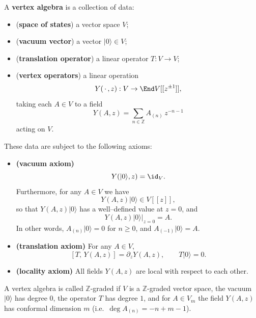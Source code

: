 \documentclass[12pt]{article}
\begin{document}
\begin{definition}
    A \textbf{vertex algebra} is a collection of data:
    \begin{itemize}
        \item (\textbf{space of states}) a vector space $V$;
        \item (\textbf{vacuum vector}) a vector $\lvert 0 \rangle \in V$;
        \item (\textbf{translation operator}) a linear operator $T : V \to V$;
        \item (\textbf{vertex operators}) a linear operation
              \[
                  Y(\,\cdot\,,z) : V \to \End V[[z^{\pm1}]],
              \]
              taking each $A \in V$ to a field
              \[
                  Y(A,z) = \sum_{n \in \mathbb{Z}} A_{(n)}\,z^{-n-1}
              \]
              acting on $V$.
    \end{itemize}

    These data are subject to the following axioms:
    \begin{itemize}
        \item \textbf{(vacuum axiom)}
              \[
                  Y(\lvert 0 \rangle, z) = \id_V.
              \]
              Furthermore, for any $A \in V$ we have
              \[
                  Y(A,z)\lvert 0 \rangle \in V[[z]],
              \]
              so that $Y(A,z)\lvert 0 \rangle$ has a well–defined value at $z=0$, and
              \[
                  Y(A,z)\lvert 0 \rangle\big|_{z=0} = A.
              \]
              In other words, $A_{(n)}\lvert 0 \rangle = 0$ for $n \ge 0$, and
              $A_{(-1)}\lvert 0 \rangle = A$.

        \item \textbf{(translation axiom)}
              For any $A \in V$,
              \[
                  [T,\,Y(A,z)] = \partial_z Y(A,z),
                  \qquad
                  T\lvert 0 \rangle = 0.
              \]

        \item \textbf{(locality axiom)}
              All fields $Y(A,z)$ are local with respect to each other.
    \end{itemize}

    A vertex algebra is called \(\mathbb{Z}\)-graded if \(V\) is a
    \(\mathbb{Z}\)-graded vector space,
    the vacuum \(\lvert 0 \rangle\) has degree \(0\),
    the operator \(T\) has degree \(1\), and for \(A \in V_m\) the field \(Y(A,z)\)
    has conformal dimension \(m\) (i.e.\ $\deg A_{(n)} = -n + m - 1$).
\end{definition}
\end{document}
